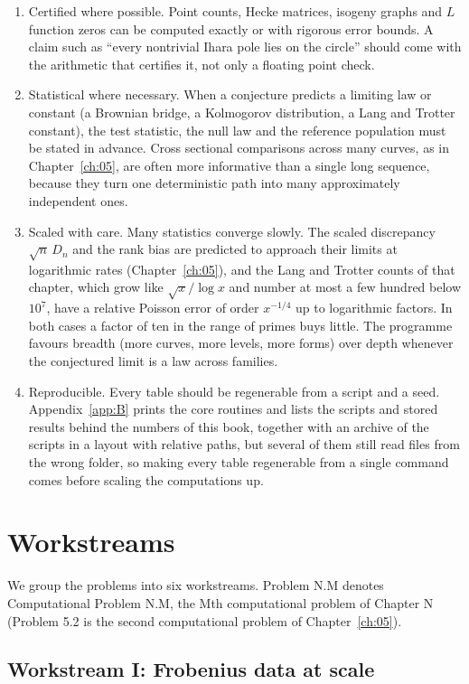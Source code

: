 \begin{enumerate}
\item Certified where possible. Point counts, Hecke matrices, isogeny graphs and $L$ function zeros can be computed exactly or with rigorous error bounds. A claim such as ``every nontrivial Ihara pole lies on the circle'' should come with the arithmetic that certifies it, not only a floating point check.
\item Statistical where necessary. When a conjecture predicts a limiting law or constant (a Brownian bridge, a Kolmogorov distribution, a Lang and Trotter constant), the test statistic, the null law and the reference population must be stated in advance. Cross sectional comparisons across many curves, as in Chapter~\ref{ch:05}, are often more informative than a single long sequence, because they turn one deterministic path into many approximately independent ones.
\item Scaled with care. Many statistics converge slowly. The scaled discrepancy $\sqrt n\,D_n$ and the rank bias are predicted to approach their limits at logarithmic rates (Chapter~\ref{ch:05}), and the Lang and Trotter counts of that chapter, which grow like $\sqrt x/\log x$ and number at most a few hundred below $10^7$, have a relative Poisson error of order $x^{-1/4}$ up to logarithmic factors. In both cases a factor of ten in the range of primes buys little. The programme favours breadth (more curves, more levels, more forms) over depth whenever the conjectured limit is a law across families.
\item Reproducible. Every table should be regenerable from a script and a seed. Appendix~\ref{app:B} prints the core routines and lists the scripts and stored results behind the numbers of this book, together with an archive of the scripts in a layout with relative paths, but several of them still read files from the wrong folder, so making every table regenerable from a single command comes before scaling the computations up.
\end{enumerate}

\section{Workstreams}

We group the problems into six workstreams. Problem N.M denotes Computational Problem N.M, the Mth computational problem of Chapter N (Problem 5.2 is the second computational problem of Chapter~\ref{ch:05}).

\subsection{Workstream I: Frobenius data at scale}


